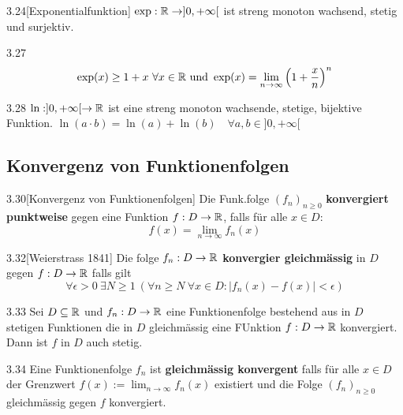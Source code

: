 \begin{satz}{3.24}[Exponentialfunktion]
    $\exp: \mathbb{R} \to ]0,+\infty[$ ist streng monoton wachsend, stetig und surjektiv.
\end{satz}

\begin{korollar}{3.27}
    \[
        \exp(x) \ge 1 + x\ \forall x \in \R\ \mbox{und}\
        \exp(x) = \lim_{n \to \infty} \left( 1 + \frac{x}{n} \right)^n \]
\end{korollar}

\begin{korollar}{3.28}
    $\ln: ]0,+\infty[ \to \mathbb{R}$ ist eine streng monoton wachsende, stetige, bijektive Funktion.
            $\ln(a \cdot b) = \ln(a) + \ln(b)\quad \forall a,b \in ]0,+\infty[$
\end{korollar}

\subsection{Konvergenz von Funktionenfolgen}
\begin{definition}{3.30}[Konvergenz von Funktionenfolgen]
    Die Funk.folge $(f_n)_{n \ge 0}$ \textbf{konvergiert punktweise} gegen eine Funktion $f: D \to \mathbb{R}$, falls für alle $x \in D$:
    \[ f(x) = \lim_{n \to \infty} f_n(x) \]
\end{definition}

\begin{definition}{3.32}[Weierstrass 1841]
    Die folge $f_n: D \to \mathbb{R}$ \textbf{konvergier gleichmässig} in $D$ gegen $f: D \to \mathbb{R}$ falls gilt
    \[ \forall \epsilon > 0\ \exists N \ge 1\ (\forall n \ge N\ \forall x \in D : |f_n(x) - f(x)| < \epsilon ) \]
\end{definition}

\begin{satz}{3.33}
    Sei $D \subseteq \mathbb{R}$ und $f_n : D \to \mathbb{R}$ eine Funktionenfolge bestehend aus in $D$ stetigen Funktionen die in $D$ gleichmässig eine FUnktion $f: D \to \mathbb{R}$ konvergiert.
    Dann ist $f$ in $D$ auch stetig.
\end{satz}

\begin{definition}{3.34}
    Eine Funktionenfolge $f_n$ ist \textbf{gleichmässig konvergent} falls für alle $x \in D$ der Grenzwert $f(x) := \lim_{n \to \infty} f_n(x)$
    existiert und die Folge $(f_n)_{n \ge 0}$ gleichmässig gegen $f$ konvergiert.
\end{definition}

